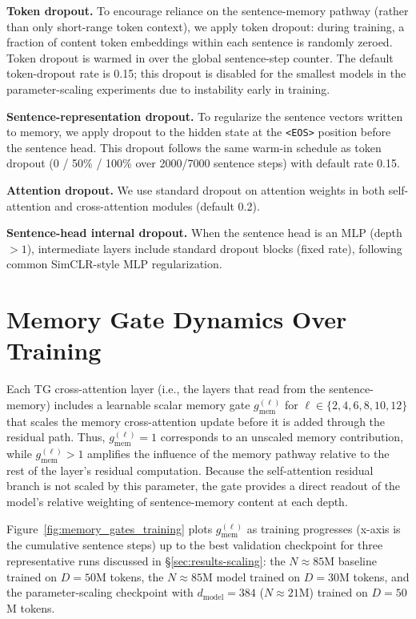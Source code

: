 \documentclass{article}
\begin{document}
\textbf{Token dropout.}
    To encourage reliance on the sentence-memory pathway (rather than only short-range token context), we apply token dropout: during training, a fraction of content token embeddings within each sentence is randomly zeroed. Token dropout is warmed in over the global sentence-step counter.
    The default token-dropout rate is 0.15; this dropout is disabled for the smallest models in the parameter-scaling experiments due to instability early in training.

\textbf{Sentence-representation dropout.}
    To regularize the sentence vectors written to memory, we apply dropout to the hidden state at the \texttt{<EOS>} position before the sentence head.
    This dropout follows the same warm-in schedule as token dropout (0 / 50\% / 100\% over 2000/7000 sentence steps) with default rate 0.15.

\textbf{Attention dropout.}
    We use standard dropout on attention weights in both self-attention and cross-attention modules (default 0.2).

\textbf{Sentence-head internal dropout.}
    When the sentence head is an MLP (depth $>1$), intermediate layers include standard dropout blocks (fixed rate), following common SimCLR-style MLP regularization.




\section{Memory Gate Dynamics Over Training}
\label{app:memory_gate_plots}

Each TG cross-attention layer (i.e., the layers that read from the sentence-memory) includes a learnable scalar memory gate $g_{\mathrm{mem}}^{(\ell)}$ for $ \ell\in\{2,4,6,8,10,12\}$ that scales the memory cross-attention update before it is added through the residual path.
Thus, $g_{\mathrm{mem}}^{(\ell)}{=}1$ corresponds to an unscaled memory contribution, while $g_{\mathrm{mem}}^{(\ell)}{>}1$ amplifies the influence of the memory pathway relative to the rest of the layer’s residual computation. 
Because the self-attention residual branch is not scaled by this parameter, the gate provides a direct readout of the model’s relative weighting of sentence-memory content at each depth.

Figure~\ref{fig:memory_gates_training} plots $g_{\mathrm{mem}}^{(\ell)}$ as training progresses (x-axis is the cumulative sentence steps) up to the best validation checkpoint for three representative runs discussed in \S\ref{sec:results-scaling}: the $N{\approx}85$M baseline trained on $D{=}50$M tokens, the $N{\approx}85$M model trained on $D{=}30$M tokens, and the parameter-scaling checkpoint with $d_{\text{model}}{=}384$ ($N{\approx}21$M) trained on $D{=}50$M tokens.
\end{document}
